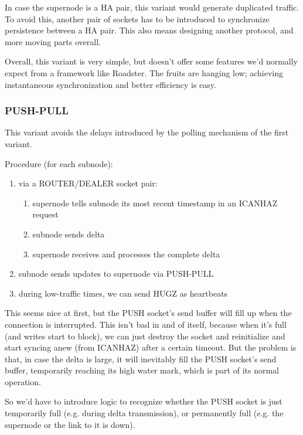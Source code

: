 In case the supernode is a HA pair, this variant would generate duplicated
traffic. To avoid this, another pair of sockets has to be introduced to
synchronize persistence between a HA pair. This also means designing another
protocol, and more moving parts overall.


Overall, this variant is very simple, but doesn't offer some features we'd
normally expect from a framework like Roadster. The fruits are hanging low;
achieving instantaneous synchronization and better efficiency is easy.

\subsubsection{PUSH-PULL}
This variant avoids the delays introduced by the polling mechanism of the first variant.

Procedure (for each subnode):
\begin{enumerate}
	\item via a ROUTER/DEALER socket pair:
		\begin{enumerate}
			\item supernode tells subnode its most recent timestamp in an ICANHAZ request
			\item subnode sends delta
			\item supernode receives and processes the complete delta
		\end{enumerate}
	\item subnode sends updates to supernode via PUSH-PULL
	\item during low-traffic times, we can send HUGZ as heartbeats
\end{enumerate}

This seems nice at first, but the PUSH socket's send buffer will fill up when the
connection is interrupted.  This isn't bad in and of itself, because when it's
full (and writes start to block), we can just destroy the socket and
reinitialize and start syncing anew (from ICANHAZ) after a certain timeout.
But the problem is that, in case the delta is large, it will inevitably fill
the PUSH socket's send buffer, temporarily reaching its high water mark, which
is part of its normal operation.

So we'd have to introduce logic to recognize whether the PUSH
socket is just temporarily full (e.g. during delta transmission), or
permanently full (e.g. the supernode or the link to it is down).



